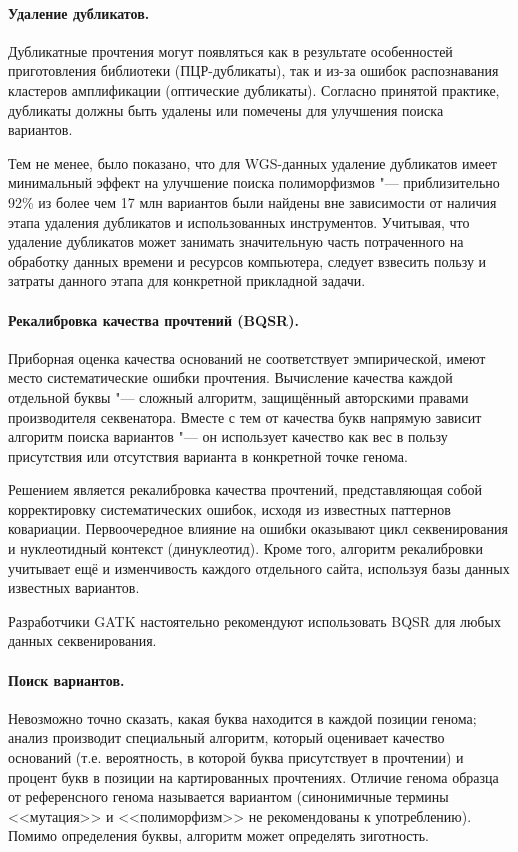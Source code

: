 \documentclass[a4paper,12pt]{article}
\begin{document}
\paragraph{Удаление дубликатов.}
Дубликатные прочтения могут появляться как в результате особенностей приготовления библиотеки (ПЦР-дубликаты), так и из-за ошибок распознавания кластеров амплификации (оптические дубликаты).
Согласно принятой практике, дубликаты должны быть удалены или помечены для улучшения поиска вариантов\cite{gatk}.

Тем не менее, было показано, что для WGS-данных удаление дубликатов имеет минимальный эффект на улучшение поиска полиморфизмов "--- приблизительно 92\% из более чем 17 млн вариантов были найдены вне зависимости от наличия этапа удаления дубликатов и использованных инструментов\cite{ebbert}.
Учитывая, что удаление дубликатов может занимать значительную часть потраченного на обработку данных времени и ресурсов компьютера, следует взвесить пользу и затраты данного этапа для конкретной прикладной задачи.

\paragraph{Рекалибровка качества прочтений (BQSR).}
Приборная оценка качества оснований не соответствует эмпирической, имеют место систематические ошибки прочтения.
Вычисление качества каждой отдельной буквы "--- сложный алгоритм, защищённый авторскими правами производителя секвенатора.
Вместе с тем от качества букв напрямую зависит алгоритм поиска вариантов "--- он использует качество как вес в пользу присутствия или отсутствия варианта в конкретной точке генома.

Решением является рекалибровка качества прочтений, представляющая собой корректировку систематических ошибок, исходя из известных паттернов ковариации.
Первоочередное влияние на ошибки оказывают цикл секвенирования и нуклеотидный контекст (динуклеотид).
Кроме того, алгоритм рекалибровки учитывает ещё и изменчивость каждого отдельного сайта, используя базы данных известных вариантов.

Разработчики GATK настоятельно рекомендуют использовать BQSR для любых данных секвенирования\cite{gatk}.

\paragraph{Поиск вариантов.}
Невозможно точно сказать, какая буква находится в каждой позиции генома;
анализ производит специальный алгоритм, который оценивает качество оснований (т.е. вероятность, в которой буква присутствует в прочтении) и процент букв в позиции на картированных прочтениях.
Отличие генома образца от референсного генома называется вариантом (синонимичные термины <<мутация>> и <<полиморфизм>> не рекомендованы к употреблению\cite{richards}).
Помимо определения буквы, алгоритм может определять зиготность.
\end{document}
